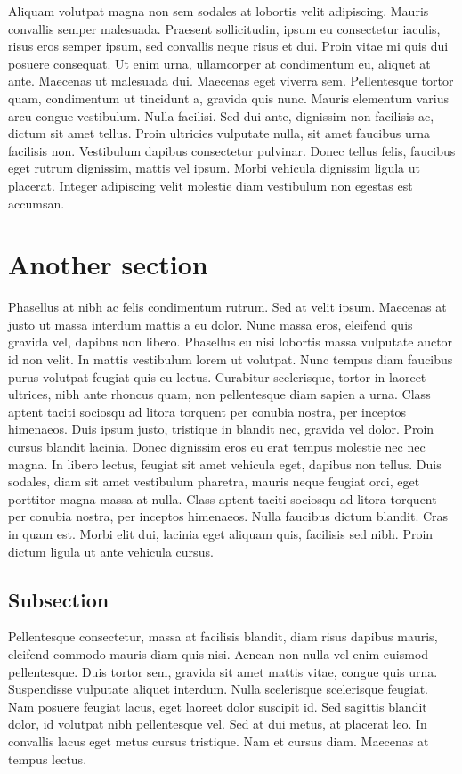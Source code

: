 \documentclass{inwwct}
\begin{document}
Aliquam volutpat magna non sem sodales at lobortis velit adipiscing. Mauris convallis semper malesuada. Praesent sollicitudin,
ipsum eu consectetur iaculis, risus eros semper ipsum, sed convallis neque risus et dui. Proin vitae mi quis dui posuere
consequat. Ut enim urna, ullamcorper at condimentum eu, aliquet at ante. Maecenas ut malesuada dui. Maecenas eget viverra sem.
Pellentesque tortor quam, condimentum ut tincidunt a, gravida quis nunc. Mauris elementum varius arcu congue vestibulum. Nulla
facilisi. Sed dui ante, dignissim non facilisis ac, dictum sit amet tellus. Proin ultricies vulputate nulla, sit amet faucibus
urna facilisis non. Vestibulum dapibus consectetur pulvinar. Donec tellus felis, faucibus eget rutrum dignissim, mattis vel ipsum.
Morbi vehicula dignissim ligula ut placerat. Integer adipiscing velit molestie diam vestibulum non egestas est accumsan.

\section{Another section}
\label{sec:related}

Phasellus at nibh ac felis condimentum rutrum. Sed at velit ipsum. Maecenas at justo ut massa interdum mattis a eu dolor. Nunc
massa eros, eleifend quis gravida vel, dapibus non libero. Phasellus eu nisi lobortis massa vulputate auctor id non velit. In
mattis vestibulum lorem ut volutpat. Nunc tempus diam faucibus purus volutpat feugiat quis eu lectus. Curabitur scelerisque,
tortor in laoreet ultrices, nibh ante rhoncus quam, non pellentesque diam sapien a urna. Class aptent taciti sociosqu ad litora
torquent per conubia nostra, per inceptos himenaeos. Duis ipsum justo, tristique in blandit nec, gravida vel dolor. Proin cursus
blandit lacinia. Donec dignissim eros eu erat tempus molestie nec nec magna. In libero lectus, feugiat sit amet vehicula eget,
dapibus non tellus. Duis sodales, diam sit amet vestibulum pharetra, mauris neque feugiat orci, eget porttitor magna massa at
nulla. Class aptent taciti sociosqu ad litora torquent per conubia nostra, per inceptos himenaeos. Nulla faucibus dictum blandit.
Cras in quam est. Morbi elit dui, lacinia eget aliquam quis, facilisis sed nibh. Proin dictum ligula ut ante vehicula cursus.

\subsection{Subsection}

Pellentesque consectetur, massa at facilisis blandit, diam risus dapibus mauris, eleifend commodo mauris diam quis nisi. Aenean
non nulla vel enim euismod pellentesque. Duis tortor sem, gravida sit amet mattis vitae, congue quis urna. Suspendisse vulputate
aliquet interdum. Nulla scelerisque scelerisque feugiat. Nam posuere feugiat lacus, eget laoreet dolor suscipit id. Sed sagittis
blandit dolor, id volutpat nibh pellentesque vel. Sed at dui metus, at placerat leo. In convallis lacus eget metus cursus
tristique. Nam et cursus diam. Maecenas at tempus lectus.
\end{document}
